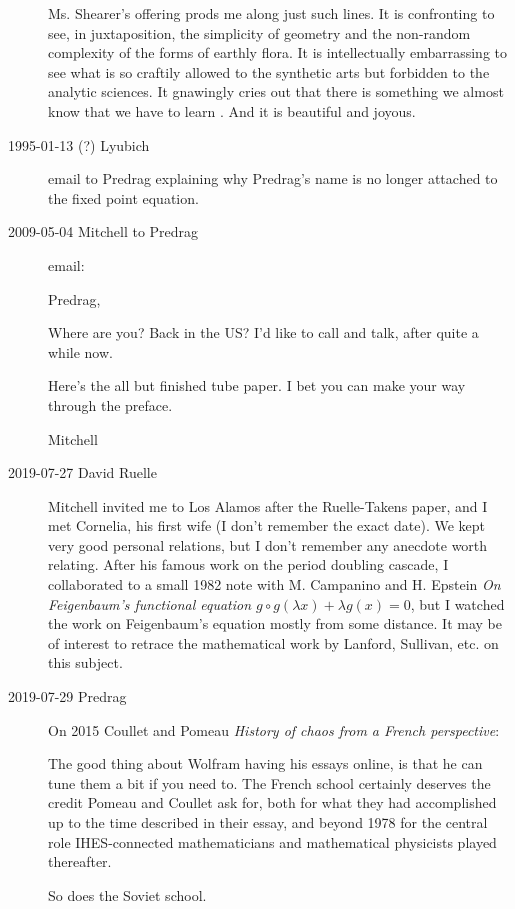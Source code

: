 \begin{description}
Ms. Shearer's offering prods me along just such lines. It is confronting
to see, in juxtaposition, the simplicity of geometry and the non-random
complexity of the forms of earthly flora. It is intellectually
embarrassing to see what is so craftily allowed to the synthetic arts but
forbidden to the analytic sciences. It gnawingly cries out that there is
something we almost know that we have to learn . And it is beautiful and
joyous.


\item[1995-01-13 (?) Lyubich]
email to Predrag explaining why Predrag's name is no longer attached
to the fixed point equation.

\item[2009-05-04 Mitchell to Predrag] email: %

Predrag,

Where are you?  Back in the US?  I'd like to call and talk, after quite a
while now.

Here's the all but finished
\HREF{} {tube paper}.  I bet you can make your way through
the preface.

Mitchell


\item[2019-07-27 David Ruelle] %
Mitchell invited me to Los Alamos after the Ruelle-Takens paper, and I
met Cornelia, his first wife (I don't remember the exact date).  We kept
very good personal relations, but I don't remember any anecdote worth
relating.  After his famous work on the period doubling cascade, I
collaborated to a small 1982 note with M. Campanino and H.
Epstein {\em On {Feigenbaum}'s functional equation {$g \circ
g(\lambda x) + \lambda g(x) = 0$}}, but I watched the work on
Feigenbaum's equation mostly from some distance.  It may be of interest
to retrace the mathematical work by Lanford, Sullivan, etc. on this
subject.


\item[2019-07-29 Predrag]
On 2015 Coullet and Pomeau
{\em History of chaos from a {French} perspective}:

The good thing about Wolfram having his essays online, is that he can
tune them a bit if you need to. The French school certainly deserves the
credit Pomeau and Coullet ask for, both for what they had accomplished up
to the time described in their essay, and beyond 1978 for the central
role IHES-connected mathematicians and mathematical physicists played
thereafter.

So does the Soviet school.


\end{description}

